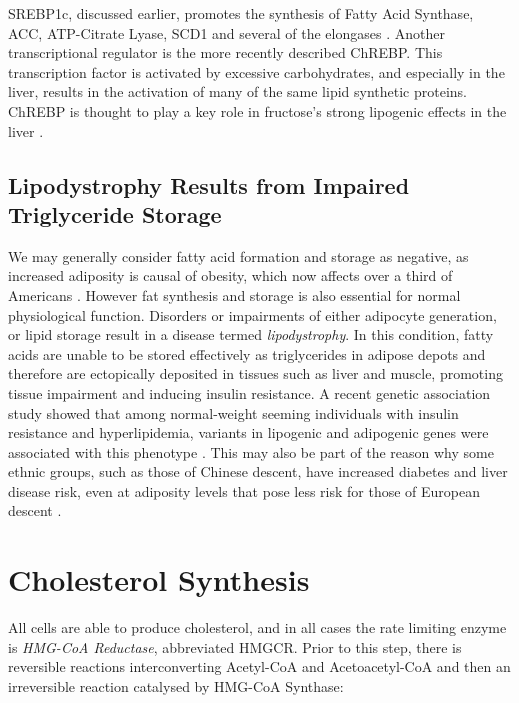 \documentclass{tufte-handout}
\begin{document}
  SREBP1c, discussed earlier, promotes the synthesis of Fatty Acid Synthase, ACC, ATP-Citrate Lyase, SCD1 and several of the elongases \citep{Horton2002b,Moon2012b}.  Another transcriptional regulator is the more recently described ChREBP.  This transcription factor is activated by excessive carbohydrates, and especially in the liver, results in the activation of many of the same lipid synthetic proteins.  ChREBP is thought to play a key role in fructose's strong lipogenic effects in the liver \citep{Kim2016d}.

\subsection{Lipodystrophy Results from Impaired Triglyceride Storage}

We may generally consider fatty acid formation and storage as negative, as increased adiposity is causal of obesity, which now affects over a third of Americans \citep{Flegal2016}.  However fat synthesis and storage is also essential for normal physiological function.  Disorders or impairments of either adipocyte generation, or lipid storage result in a disease termed \emph{lipodystrophy}.  In this condition, fatty acids are unable to be stored effectively as triglycerides in adipose depots and therefore are ectopically deposited in tissues such as liver and muscle, promoting tissue impairment and inducing insulin resistance.  A recent genetic association study showed that among normal-weight seeming individuals with insulin resistance and hyperlipidemia, variants in lipogenic and adipogenic genes were associated with this phenotype \citep{Lotta2016a}.  This may also be part of the reason why some ethnic groups, such as those of Chinese descent, have increased diabetes and liver disease risk, even at adiposity levels that pose less risk for those of European descent \citep{Chiu2011a}.

\section{Cholesterol Synthesis}

All cells are able to produce cholesterol, and in all cases the rate limiting enzyme is \emph{HMG-CoA Reductase}, abbreviated HMGCR.  Prior to this step, there is reversible reactions interconverting Acetyl-CoA and Acetoacetyl-CoA and then an irreversible reaction catalysed by HMG-CoA Synthase:
\end{document}
